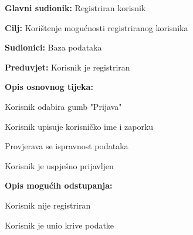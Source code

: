 										\noindent {}
					\begin{packed_item}
	
						   \item \textbf{Glavni sudionik: } Registriran korisnik
						   \item  \textbf{Cilj:} Korištenje mogućnosti registriranog korisnika
						   \item  \textbf{Sudionici:} Baza podataka
				 	   	   \item  \textbf{Preduvjet:} Korisnik je registriran
							\item  \textbf{Opis osnovnog tijeka:}
	
					\item[] \begin{packed_enum}
		
							\item Korisnik odabira gumb "Prijava"
							\item Korisnik upisuje korisničko ime i zaporku
							\item Provjerava se ispravnost podataka
							\item Korisnik je uspješno prijavljen
				\end{packed_enum}
	
					\item  \textbf{Opis mogućih odstupanja:}
	
						\item[] \begin{packed_item}
		
						\item[2.b] 
						\item[] \begin{packed_enum}
			
									\item Korisnik nije registriran
								\item Korisnik je unio krive podatke 
			
								\end{packed_enum}
		
						\end{packed_item}
				\end{packed_item}		
					
